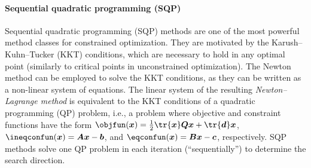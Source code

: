 \paragraph{Sequential quadratic programming (SQP)}

Sequential quadratic programming (SQP) methods
are one of the most powerful method classes for constrained optimization.
They are motivated by the Karush--Kuhn--Tucker (KKT) conditions,
which are necessary to hold in any optimal point
(similarly to critical points in unconstrained optimization).
The Newton method can be employed to solve the KKT conditions,
as they can be written as a non-linear system of equations.
The linear system of the resulting \emph{Newton--Lagrange method}
is equivalent to the KKT conditions of a quadratic programming (QP) problem,
i.e., a problem where objective and constraint functions have the
form $\objfun(\*x) = \frac{1}{2} \tr{\*x} \mat{Q} \*x + \tr{\*d} \*x$,
$\ineqconfun(\*x) = \mat{A} \*x - \*b$, and
$\eqconfun(\*x) = \mat{B} \*x - \*c$, respectively.
SQP methods solve one QP problem in each iteration (``sequentially'')
to determine the search direction.
